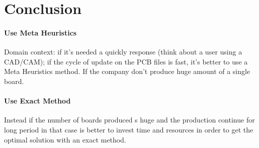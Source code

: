 \section{Conclusion}

	\paragraph{Use Meta Heuristics}
	Domain context:
		if it's needed a quickly response (think about a user using a CAD/CAM);
		if the cycle of update on the PCB files is fast, it's better to use a Meta Heuristics method.
		If the company don't produce huge amount of a single board.
		
	\paragraph{Use Exact Method}
		Instead if the number of boards produced s huge and the production continue for long period in that case is better to invest time and resources in order to get the optimal solution with an exact method.